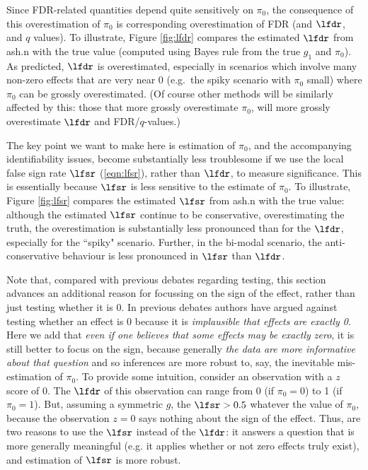 Since FDR-related quantities depend quite sensitively on $\pi_0$, the consequence of this 
overestimation of $\pi_0$ is corresponding overestimation of FDR (and $\lfdr$, and $q$ values).
To illustrate, Figure \ref{fig:lfdr} compares the estimated $\lfdr$ from ash.n with the true value (computed using
Bayes rule from the true $g_1$ and $\pi_0$). As predicted, $\lfdr$ is overestimated, especially in scenarios which involve many
non-zero effects that are very near 0 (e.g.~the spiky scenario with $\pi_0$ small) where
$\pi_0$ can be grossly overestimated.  
(Of course other methods will be similarly affected by this: those that more grossly overestimate $\pi_0$, will more grossly overestimate $\lfdr$ and FDR/$q$-values.)

The key point we want to make here is estimation of $\pi_0$, and the accompanying identifiability issues,
 become substantially less troublesome if we use the local false sign rate $\lfsr$ (\ref{eqn:lfsr}), rather than $\lfdr$, to measure significance. 
 This is essentially because $\lfsr$ is less sensitive to the estimate of $\pi_0$.
To illustrate, Figure \ref{fig:lfsr} compares the estimated $\lfsr$ from ash.n with the true value: although the estimated $\lfsr$ continue to
be conservative, overestimating the truth, the overestimation is substantially less pronounced than for the $\lfdr$, especially for
the ``spiky" scenario. Further, in the bi-modal scenario, the anti-conservative behaviour is less pronounced in $\lfsr$ than $\lfdr$.

Note that, compared with previous debates regarding testing, 
this section advances an additional reason for focussing on the sign of the effect, rather than just testing whether it is 0. 
In previous debates authors have argued against testing whether an effect is 0
because it is {\it implausible that effects are exactly 0}. Here we add that {\it even if one believes
that some effects may be exactly zero}, it is still better to focus on the sign, because generally {\it the data are more informative about that question}
and so inferences are more robust to, say, the inevitable mis-estimation of $\pi_0$.
To provide some intuition, consider an observation with a $z$ score of 0. The $\lfdr$ of this observation can range from 0 (if $\pi_0=0$)
to 1 (if $\pi_0=1$). But, assuming a symmetric $g$, the $\lfsr>0.5$ whatever the value of $\pi_0$, because the observation $z=0$ says
nothing about the sign of the effect.
Thus, are two reasons to use the $\lfsr$ instead of the $\lfdr$: it answers a question that is more generally meaningful (e.g. it applies
whether or not zero effects truly exist),  and estimation of $\lfsr$ is more robust.

